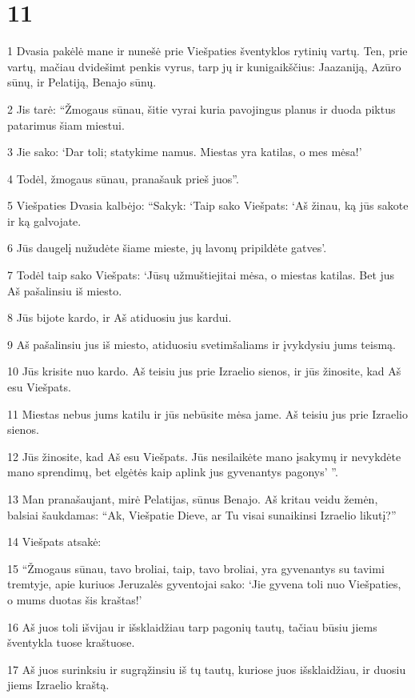 \chapter{11}


\par 1 Dvasia pakėlė mane ir nunešė prie Viešpaties šventyklos rytinių vartų. Ten, prie vartų, mačiau dvidešimt penkis vyrus, tarp jų ir kunigaikščius: Jaazaniją, Azūro sūnų, ir Pelatiją, Benajo sūnų. 
\par 2 Jis tarė: “Žmogaus sūnau, šitie vyrai kuria pavojingus planus ir duoda piktus patarimus šiam miestui. 
\par 3 Jie sako: ‘Dar toli; statykime namus. Miestas yra katilas, o mes­ mėsa!’ 
\par 4 Todėl, žmogaus sūnau, pranašauk prieš juos”. 
\par 5 Viešpaties Dvasia kalbėjo: “Sakyk: ‘Taip sako Viešpats: ‘Aš žinau, ką jūs sakote ir ką galvojate. 
\par 6 Jūs daugelį nužudėte šiame mieste, jų lavonų pripildėte gatves’. 
\par 7 Todėl taip sako Viešpats: ‘Jūsų užmuštieji­tai mėsa, o miestas­ katilas. Bet jus Aš pašalinsiu iš miesto. 
\par 8 Jūs bijote kardo, ir Aš atiduosiu jus kardui. 
\par 9 Aš pašalinsiu jus iš miesto, atiduosiu svetimšaliams ir įvykdysiu jums teismą. 
\par 10 Jūs krisite nuo kardo. Aš teisiu jus prie Izraelio sienos, ir jūs žinosite, kad Aš esu Viešpats. 
\par 11 Miestas nebus jums katilu ir jūs nebūsite mėsa jame. Aš teisiu jus prie Izraelio sienos. 
\par 12 Jūs žinosite, kad Aš esu Viešpats. Jūs nesilaikėte mano įsakymų ir nevykdėte mano sprendimų, bet elgėtės kaip aplink jus gyvenantys pagonys’ ”. 
\par 13 Man pranašaujant, mirė Pelatijas, sūnus Benajo. Aš kritau veidu žemėn, balsiai šaukdamas: “Ak, Viešpatie Dieve, ar Tu visai sunaikinsi Izraelio likutį?” 
\par 14 Viešpats atsakė: 
\par 15 “Žmogaus sūnau, tavo broliai, taip, tavo broliai, yra gyvenantys su tavimi tremtyje, apie kuriuos Jeruzalės gyventojai sako: ‘Jie gyvena toli nuo Viešpaties, o mums duotas šis kraštas!’ 
\par 16 Aš juos toli išvijau ir išsklaidžiau tarp pagonių tautų, tačiau būsiu jiems šventykla tuose kraštuose. 
\par 17 Aš juos surinksiu ir sugrąžinsiu iš tų tautų, kuriose juos išsklaidžiau, ir duosiu jiems Izraelio kraštą. 
